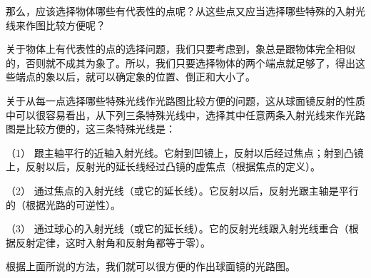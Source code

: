 那么，应该选择物体哪些有代表性的点呢？从这些点又应当选择哪些特殊的入射光线来作图比较方便呢？

关于物体上有代表性的点的选择问题，我们只要考虑到，象总是跟物体完全相似的，否则就不成其为象了。所以，我们只要选择物体的两个端点就足够了，得出这些端点的象以后，就可以确定象的位置、倒正和大小了。

关于从每一点选择哪些特殊光线作光路图比较方便的问题，这从球面镜反射的性质中可以很容易看出，从下列三条特殊光线中，选择其中任意两条入射光线来作光路图是比较方便的，这三条特殊光线是：

（1）
跟主轴平行的近轴入射光线。它射到凹镜上，反射以后经过焦点；射到凸镜上，反射以后，反射光的延长线经过凸镜的虚焦点（根据焦点的定义）。

（2）
通过焦点的入射光线（或它的延长线）。它反射以后，反射光跟主轴是平行的（根据光路的可逆性）。

（3）
通过球心的入射光线（或它的延长线）。它的反射光线跟入射光线重合（根据反射定律，这时入射角和反射角都等于零）。

根据上面所说的方法，我们就可以很方便的作出球面镜的光路图。

